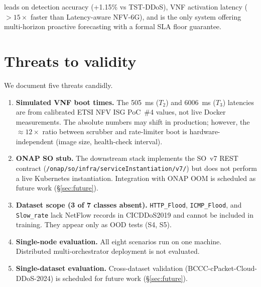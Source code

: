 \padonap{} leads on detection accuracy (+1.15\% vs TST-DDoS),
VNF activation latency ($>15\times$ faster than Latency-aware NFV-6G),
and is the only system offering multi-horizon proactive forecasting
with a formal SLA floor guarantee.

\section{Threats to validity}
\label{sec:validity}

We document five threats candidly.

\begin{enumerate}
  \item \textbf{Simulated VNF boot times.}
        The 505~ms ($T_2$) and 6006~ms ($T_3$) latencies are from
        calibrated ETSI NFV ISG PoC~\#4 values, not live Docker
        measurements. The absolute numbers may shift in production;
        however, the $\approx 12\times$ ratio between scrubber and
        rate-limiter boot is hardware-independent (image size,
        health-check interval).

  \item \textbf{ONAP SO stub.}
        The downstream stack implements the SO~v7 REST contract
        (\texttt{/onap/so/infra/serviceInstantiation/v7/}) but does
        not perform a live Kubernetes instantiation. Integration with
        ONAP OOM is scheduled as future work (\S\ref{sec:future}).

  \item \textbf{Dataset scope (3 of 7 classes absent).}
        \texttt{HTTP\_Flood}, \texttt{ICMP\_Flood}, and
        \texttt{Slow\_rate} lack NetFlow records in CICDDoS2019 and
        cannot be included in training. They appear only as OOD
        tests (S4, S5).

  \item \textbf{Single-node evaluation.}
        All eight scenarios run on one machine. Distributed
        multi-orchestrator deployment is not evaluated.

  \item \textbf{Single-dataset evaluation.}
        Cross-dataset validation (BCCC-cPacket-Cloud-DDoS-2024) is
        scheduled for future work (\S\ref{sec:future}).
\end{enumerate}
